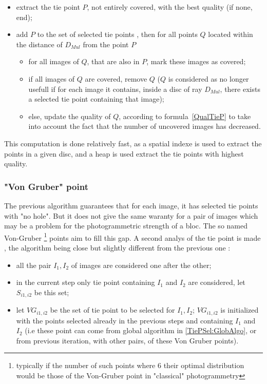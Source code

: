 \begin{itemize}
   \item extract the tie point $P$, not entirely covered, with the best quality (if none, end);
   \item add   $P$ to the set of selected tie points , then for all points $Q$ located within the distance of $D_{Mul}$ from the point $P$
         

   \begin{itemize}
         \item  for all images of $Q$, that are also in $P$, mark these images as covered;
         \item  if all images of $Q$ are covered, remove $Q$ ($Q$ is considered as no longer usefull if
                for each image  it contains, inside  a disc of ray $D_{Mul}$, there exists a selected tie point
                containing that image);
         \item  else, update the quality of  $Q$, according to formula~\ref{QualTieP} to take into account
                the fact that the number of uncovered images has decreased.
   \end{itemize}
\end{itemize}

This computation is done relatively fast, as a spatial indexe is used to extract the points in
a given disc, and a heap is used extract the tie points with highest quality. 


\subsubsection{"Von Gruber" point}

The previous algorithm
guarantees that for each image, it has selected tie points with "no hole". But it does not
give the same waranty for a pair of images which may be a problem for the photogrammetric
strength of a bloc. The so named Von-Gruber \footnote{typically if the number of such points where $6$
their optimal distribution would be those of the Von-Gruber point in "classical" photogrammetry} 
points aim to fill
this gap. A second analys of the tie point is made , the algorithm being close
but slightly different from the previous one :


\begin{itemize}
   \item  all the pair  $I_1,I_2$ of images are considered  one after the other;

   \item  in the current step only tie point containing $I_1$ and $I_2$ are considered, let $S_{i1,i2}$ be this set;

   \item  let  $VG_{i1,i2}$ be the set  of tie point to be selected  for $I_1,I_2$;
          $VG_{i1,i2}$ is initialized with the points
          selected already in the previous steps and containing $I_1$ and $I_2$ 
          (i.e these point can come from global algorithm  in \ref{TiePSel:GlobAlgo}, or
          from  previous iteration, with other pairs, of these Von Gruber points).

\end{itemize}

